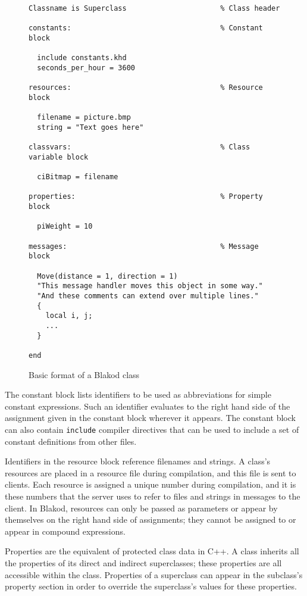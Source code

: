 \begin{figure}

\begin{verbatim}
Classname is Superclass                      % Class header

constants:                                   % Constant block

  include constants.khd
  seconds_per_hour = 3600

resources:                                   % Resource block

  filename = picture.bmp
  string = "Text goes here"

classvars:                                   % Class variable block

  ciBitmap = filename

properties:                                  % Property block

  piWeight = 10

messages:                                    % Message block

  Move(distance = 1, direction = 1)
  "This message handler moves this object in some way."
  "And these comments can extend over multiple lines."
  {
    local i, j;
    ...
  }

end
\end{verbatim}

\caption{Basic format of a Blakod class}
\label{fig:class}

\end{figure}

The constant block lists identifiers to be used as abbreviations for
simple constant expressions.  Such an identifier evaluates to the
right hand side of the assignment given in the constant block wherever
it appears.  The constant block can also contain {\tt include}
compiler directives that can be used to include a set of constant
definitions from other files.

Identifiers in the resource block reference filenames and strings.  A
class's resources are placed in a resource file during compilation,
and this file is sent to clients.  Each resource is assigned a unique
number during compilation, and it is these numbers that the server
uses to refer to files and strings in messages to the client.  In
Blakod, resources can only be passed as parameters or appear by
themselves on the right hand side of assignments; they cannot be
assigned to or appear in compound expressions.

Properties are the equivalent of protected class data in C++.  A class
inherits all the properties of its direct and indirect superclasses;
these properties are all accessible within the class.  Properties of a
superclass can appear in the subclass's property section in order to
override the superclass's values for these properties.

